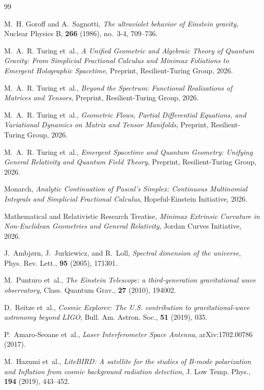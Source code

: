 \documentclass[aps,prl,reprint,twocolumn,superscriptaddress,nofootinbib,floatfix]{revtex4-2}
\begin{document}
\begin{thebibliography}{99}

M.~H. Goroff and A.~Sagnotti,
\emph{The ultraviolet behavior of Einstein gravity},
Nuclear Physics B, \textbf{266} (1986), no.~3-4, 709--736.

M.~A.~R. Turing et~al.,
\emph{A Unified Geometric and Algebraic Theory of Quantum Gravity: From Simplicial Fractional Calculus and Minimax Foliations to Emergent Holographic Spacetime},
Preprint, Resilient-Turing Group, 2026.

M.~A.~R. Turing et~al.,
\emph{Beyond the Spectrum: Functional Realizations of Matrices and Tensors},
Preprint, Resilient-Turing Group, 2026.

M.~A.~R. Turing et~al.,
\emph{Geometric Flows, Partial Differential Equations, and Variational Dynamics on Matrix and Tensor Manifolds},
Preprint, Resilient-Turing Group, 2026.

M.~A.~R. Turing et~al.,
\emph{Emergent Spacetime and Quantum Geometry: Unifying General Relativity and Quantum Field Theory},
Preprint, Resilient-Turing Group, 2026.

Monarch,
\emph{Analytic Continuation of Pascal's Simplex: Continuous Multinomial Integrals and Simplicial Fractional Calculus},
Hopeful-Einstein Initiative, 2026.

Mathematical and Relativistic Research Treatise,
\emph{Minimax Extrinsic Curvature in Non-Euclidean Geometries and General Relativity},
Jordan Curves Initiative, 2026.

J.~Ambj{\o}rn, J.~Jurkiewicz, and R.~Loll,
\emph{Spectral dimension of the universe},
Phys. Rev. Lett., \textbf{95} (2005), 171301.

M.~Punturo et~al.,
\emph{The Einstein Telescope: a third-generation gravitational wave observatory},
Class. Quantum Grav., \textbf{27} (2010), 194002.

D.~Reitze et~al.,
\emph{Cosmic Explorer: The U.S. contribution to gravitational-wave astronomy beyond LIGO},
Bull. Am. Astron. Soc., \textbf{51} (2019), 035.

P.~Amaro-Seoane et~al.,
\emph{Laser Interferometer Space Antenna},
arXiv:1702.00786 (2017).

M.~Hazumi et~al.,
\emph{LiteBIRD: A satellite for the studies of B-mode polarization and Inflation from cosmic background radiation detection},
J. Low Temp. Phys., \textbf{194} (2019), 443--452.


\end{thebibliography}
\end{document}
